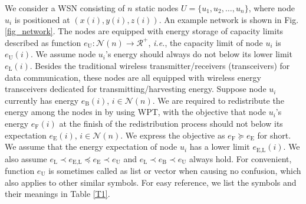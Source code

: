 \documentclass[journal,10pt]{IEEEtran}
\begin{document}
We consider a WSN consisting of $n$ static nodes $U{=}\{u_1, u_2, \ldots, u_n\}$, where node $u_i$ is positioned at $(x(i),y(i),z(i))$. An example network is shown in Fig.\ref{fig_network}. The nodes are equipped with energy storage of capacity limits described as function $e_\text{U}{:}\mathcal{N}(n){\rightarrow}\mathcal{R^{+}}$, \textit{i.e.}, the capacity limit of node $u_i$ is $e_\text{U}(i)$. We assume node $u_i$'s energy should always do not below its lower limit $e_\text{L}(i)$. Besides the traditional wireless transmitter/receivers (transceivers) for data communication, these nodes are all equipped with wireless energy transceivers dedicated for transmitting/harvesting energy. Suppose node $u_i$ currently has energy $e_\text{B}(i)$, $i{\in}\mathcal{N}(n)$. We are required to redistribute the energy among the nodes in by using WPT, with the objective that node $u_i$'s energy $e_\text{F}(i)$ at the finish of the redistribution process should not below its expectation $e_\text{E}(i)$, $i{\in}\mathcal{N}(n)$. We express the objective as $e_\text{F}{\succeq}e_\text{E}$ for short. We assume that the energy expectation of node $u_i$ has a lower limit $e_\text{E,L}(i)$. We also assume $e_\text{L}{\prec}e_\text{E,L}{\preceq}e_\text{E}{\prec}e_\text{U}$ and $e_\text{L}{\prec}e_\text{B}{\prec}e_\text{U}$ always hold. For convenient, function $e_\text{U}$ is sometimes called as list or vector when causing no confusion, which also applies to other similar symbols. For easy reference, we list the symbols and their meanings in Table \ref{T1}.
\end{document}
